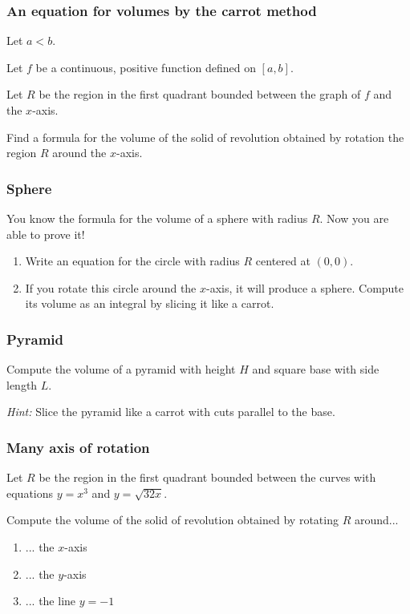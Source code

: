 \documentclass[14pt]{beamer}
\begin{document}
\begin{frame}[t]
	\frametitle{An equation for volumes by the carrot method}

	Let $a < b$.

	Let $f$ be a continuous, positive function defined on $[a,b]$.

	Let $R$ be the region in the first quadrant bounded between the graph of $f$ and
	the $x$-axis.

	Find a formula for the volume of the solid of revolution obtained by rotation the
	region $R$ around the $x$-axis.
\end{frame}

\begin{frame}[t]
	\frametitle{Sphere}

	You know the formula for the volume of a sphere with radius $R$. Now you are able
	to prove it!

	\begin{enumerate}
		\item Write an equation for the circle with radius $R$ centered at $(0,0)$.

		\item If you rotate this circle around the $x$-axis, it will produce a
			sphere. Compute its volume as an integral by slicing it like a carrot.
	\end{enumerate}
\end{frame}

\begin{frame}[t]
	\frametitle{Pyramid}

	Compute the volume of a pyramid with height $H$ and square base with side
	length $L$.

	\emph{Hint:} Slice the pyramid like a carrot with cuts parallel to the base.
\end{frame}

\begin{frame}[t]
	\frametitle{Many axis of rotation}

	Let $R$ be the region in the first quadrant bounded between the curves with
	equations $\displaystyle y = x^{3}$ and $\displaystyle y=\sqrt{32x}$.

	Compute the volume of the solid of revolution obtained by rotating $R$ around...
	\begin{enumerate}
		\item ... the $x$-axis

		\item ... the $y$-axis

		\item ... the line $y=-1$
	\end{enumerate}
\end{frame}
\end{document}
